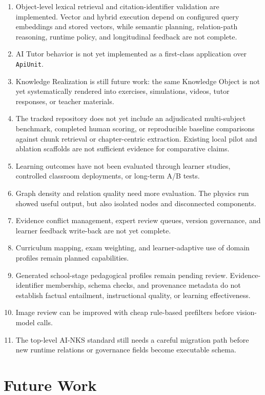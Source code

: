 \documentclass[11pt,letterpaper]{article}
\newcommand{\code}[1]{\nolinkurl{#1}}
\begin{document}
\begin{enumerate}
  \item Object-level lexical retrieval and citation-identifier validation are implemented. Vector and hybrid execution depend on configured query embeddings and stored vectors, while semantic planning, relation-path reasoning, runtime policy, and longitudinal feedback are not complete.
  \item AI Tutor behavior is not yet implemented as a first-class application over \code{ApiUnit}.
  \item Knowledge Realization is still future work: the same Knowledge Object is not yet systematically rendered into exercises, simulations, videos, tutor responses, or teacher materials.
  \item The tracked repository does not yet include an adjudicated multi-subject benchmark, completed human scoring, or reproducible baseline comparisons against chunk retrieval or chapter-centric extraction. Existing local pilot and ablation scaffolds are not sufficient evidence for comparative claims.
  \item Learning outcomes have not been evaluated through learner studies, controlled classroom deployments, or long-term A/B tests.
  \item Graph density and relation quality need more evaluation. The physics run showed useful output, but also isolated nodes and disconnected components.
  \item Evidence conflict management, expert review queues, version governance, and learner feedback write-back are not yet complete.
  \item Curriculum mapping, exam weighting, and learner-adaptive use of domain profiles remain planned capabilities.
  \item Generated school-stage pedagogical profiles remain pending review. Evidence-identifier membership, schema checks, and provenance metadata do not establish factual entailment, instructional quality, or learning effectiveness.
  \item Image review can be improved with cheap rule-based prefilters before vision-model calls.
  \item The top-level AI-NKS standard still needs a careful migration path before new runtime relations or governance fields become executable schema.
\end{enumerate}

\section{Future Work}
\end{document}

